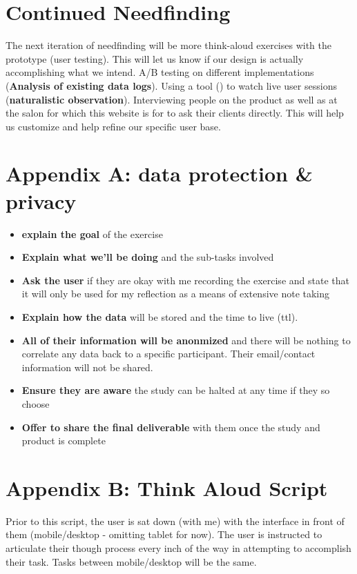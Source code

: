 \section{Continued Needfinding}
The next iteration of needfinding will be more think-aloud exercises with the prototype (user testing). This will let us know if our design is actually accomplishing what we intend. A/B testing on different implementations (\textbf{Analysis of existing data logs}). Using a tool () to watch live user sessions (\textbf{naturalistic observation}). Interviewing people on the product as well as at the salon for which this website is for to ask their clients directly. This will help us customize and help refine our specific user base.


\section{Appendix A: data protection & privacy}

\begin{itemize}
\item
  \textbf{explain the goal} of the exercise
\item
  \textbf{Explain what we'll be doing} and the sub-tasks involved
\item
  \textbf{Ask the user} if they are okay with me recording the exercise and state that it will only be used for my reflection as a means of extensive note taking
\item
  \textbf{Explain how the data} will be stored and the time to live (ttl).
\item
  \textbf{All of their information will be anonmized} and there will be nothing to correlate any data back to a specific participant. Their email/contact information will not be shared.
\item
  \textbf{Ensure they are aware} the study can be halted at any time if they so choose
\item
  \textbf{Offer to share the final deliverable} with them once the study and product is complete
\end{itemize}


\section{Appendix B: Think Aloud Script}
Prior to this script, the user is sat down (with me) with the interface in front of them (mobile/desktop - omitting tablet for now). The user is instructed to articulate their though process every inch of the way in attempting to accomplish their task. Tasks between mobile/desktop will be the same.

